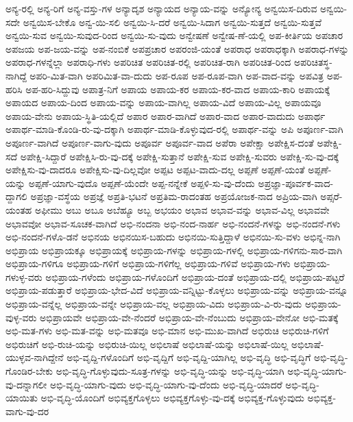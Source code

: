 {ಅನ್ಯ-ರಲ್ಲಿ
ಅನ್ಯ-ರಿಗೆ
ಅನ್ಯ-ವಸ್ತು-ಗಳ
ಅನ್ಯಾದೃಶ
ಅನ್ಯಾಯದ
ಅನ್ಯಾಯ-ವನ್ನು
ಅನ್ಯೋನ್ಯ
ಅನ್ವಯಿಸ-ದಿರುವ
ಅನ್ವಯಿ-ಸದೇ
ಅನ್ವಯಿಸ-ಬೇಕೊ
ಅನ್ವ-ಯಿ-ಸಲಿ
ಅನ್ವಯಿ-ಸಿ-ದರೆ
ಅನ್ವಯಿ-ಸಿದಾಗ
ಅನ್ವಯಿ-ಸುತ್ತದೆ
ಅನ್ವಯಿ-ಸುತ್ತವೆ
ಅನ್ವಯಿ-ಸುವ
ಅನ್ವಯಿ-ಸುವುದ-ರಿಂದ
ಅನ್ವಯಿ-ಸು-ವುದು
ಅನ್ವೇಷಣೆ
ಅನ್ವೇಷ-ಣೆ-ಯಲ್ಲಿ
ಅಪ-ಕೀರ್ತಿಯ
ಅಪಚಾರ
ಅಪಜಯ
ಅಪ-ಜಯ-ವನ್ನು
ಅಪ-ನಂಬಿಕೆ
ಅಪಪ್ರಚಾರ
ಅಪರಂಜಿ-ಯಂತೆ
ಅಪರಾಧ
ಅಪರಾಧಕ್ಕಾಗಿ
ಅಪರಾಧ-ಗಳನ್ನು
ಅಪರಾಧ-ಗಳನ್ನೆಲ್ಲಾ
ಅಪರಾಧಿ-ಗಳು
ಅಪರಿಚಿತ
ಅಪರಿಚಿತ-ರಲ್ಲಿ
ಅಪರಿಚಿತ-ರಾಗಿ
ಅಪರಿಚಿತ-ರಿಂದ
ಅಪರಿಚಿತಸ್ಥ-ನಾಗಿದ್ದೆ
ಅಪರಿ-ಮಿತ-ವಾಗಿ
ಅಪರಿಮಿತ-ವಾ-ದುದು
ಅಪ-ರೂಪ
ಅಪ-ರೂಪ-ವಾಗಿ
ಅಪ-ವಾದ-ವನ್ನು
ಅಪವಿತ್ರ
ಅಪ-ಹರಿಸಿ
ಅಪ-ಹರಿ-ಸಿದ್ದುವು
ಅಪಾತ್ರ-ನಿಗೆ
ಅಪಾಯ
ಅಪಾಯ-ಕರ
ಅಪಾಯ-ಕರ-ವಾದ
ಅಪಾಯ-ಕಾರಿ
ಅಪಾಯಕ್ಕೆ
ಅಪಾಯದ
ಅಪಾಯ-ದಿಂದ
ಅಪಾಯ-ವನ್ನು
ಅಪಾಯ-ವಾಗಿಲ್ಲ
ಅಪಾಯ-ವಿದೆ
ಅಪಾಯ-ವಿಲ್ಲ
ಅಪಾಯವೂ
ಅಪಾಯ-ವೇನು
ಅಪಾಯ-ಸ್ಥಿತಿ-ಯಲ್ಲಿದೆ
ಅಪಾರ
ಅಪಾರ-ವಾಗಿದೆ
ಅಪಾರ-ವಾದ
ಅಪಾರ-ವಾದುದು
ಅಪಾರ್ಥ
ಅಪಾರ್ಥ-ಮಾಡಿ-ಕೊಂಡಿ-ರು-ವು-ದಕ್ಕಾಗಿ
ಅಪಾರ್ಥ-ಮಾಡಿ-ಕೊಳ್ಳುವುದ-ರಲ್ಲಿ
ಅಪಾರ್ಥ-ವನ್ನು
ಅಪಿ
ಅಪೂರ್ಣ-ವಾಗಿ
ಅಪೂರ್ಣ-ವಾಗಿದೆ
ಅಪೂರ್ಣ-ವಾಗು-ವುದು
ಅಪೂರ್ವ
ಅಪೂರ್ವ-ವಾದ
ಅಪೆರಾ
ಅಪೇಕ್ಷಾ
ಅಪೇಕ್ಷಿಸ-ದಂತೆ
ಅಪೇಕ್ಷಿ-ಸದೆ
ಅಪೇಕ್ಷಿ-ಸಿದ್ದಾರೆ
ಅಪೇಕ್ಷಿಸಿ-ರು-ವು-ದಕ್ಕೆ
ಅಪೇಕ್ಷಿ-ಸುತ್ತಾನೆ
ಅಪೇಕ್ಷಿ-ಸುವ
ಅಪೇಕ್ಷಿ-ಸುವರು
ಅಪೇಕ್ಷಿ-ಸು-ವು-ದಕ್ಕೆ
ಅಪೇಕ್ಷಿಸು-ವು-ದಾದರೂ
ಅಪೇಕ್ಷಿಸು-ವು-ದಿಲ್ಲವೋ
ಅಪ್ಪಟ
ಅಪ್ಪಟ-ವಾದು-ದಲ್ಲ
ಅಪ್ಪಣೆ
ಅಪ್ಪಣೆ-ಯಂತೆ
ಅಪ್ಪಣೆ-ಯನ್ನು
ಅಪ್ಪಣೆ-ಯಾಗು-ವುದೊ
ಅಪ್ಪಣೆ-ಯೆಂದೇ
ಅಪ್ಪ-ನನ್ನೇಕೆ
ಅಪ್ಪಳಿ-ಸು-ವು-ದೆಂದು
ಅಪ್ರಜ್ಞಾ-ಪೂರ್ವಕ-ವಾದ-ದ್ದಾಗಲಿ
ಅಪ್ರಜ್ಞಾ-ವಸ್ಥೆಯ
ಅಪ್ರಜ್ಞೆ
ಅಪ್ರತಿ-ಭಟನೆ
ಅಪ್ರತಿಮ-ರಾದಂತಹ
ಅಪ್ರಯೋಜಕ-ನಾದ
ಅಪ್ರಿಯ-ವಾಗಿ
ಅಪ್ಸರೆ-ಯಂತಹ
ಅಫೀಮು
ಅಬು
ಅಬೂ
ಅಬೆಹ್ಯೂ
ಅಬ್ಬ
ಅಭಯಂ
ಅಭಾವ
ಅಭಾವ-ವನ್ನು
ಅಭಾವ-ವಿಲ್ಲ
ಅಭಾವವೇ
ಅಭಾವವೋ
ಅಭಾವ-ಸೂಚಕ-ವಾಗಿದೆ
ಅಭಿ-ನಂದನಾ
ಅಭಿ-ನಂದ-ನಾರ್ಹ
ಅಭಿ-ನಂದನೆ-ಗಳನ್ನು
ಅಭಿ-ನಂದನೆ-ಗಳು
ಅಭಿ-ನಂದನೆ-ಗಳೊ-ಡನೆ
ಅಭಿನಯ
ಅಭಿನಯಿಸ-ಬಹುದು
ಅಭಿನಯಿ-ಸುತ್ತಿದ್ದಾಳೆ
ಅಭಿನಯಿ-ಸು-ವಳು
ಅಭಿನ್ನ-ನಾಗಿ
ಅಭಿಪ್ರಾಯ
ಅಭಿಪ್ರಾಯಕ್ಕೂ
ಅಭಿಪ್ರಾಯಕ್ಕೆ
ಅಭಿಪ್ರಾಯ-ಗಳನ್ನು
ಅಭಿಪ್ರಾಯ-ಗಳಲ್ಲಿ
ಅಭಿಪ್ರಾಯ-ಗಳಿಗನು-ಸಾರ-ವಾಗಿ
ಅಭಿಪ್ರಾಯ-ಗಳಿಗೂ
ಅಭಿಪ್ರಾಯ-ಗಳಿಗೆ
ಅಭಿಪ್ರಾಯ-ಗಳಿಗೆಲ್ಲ
ಅಭಿಪ್ರಾಯ-ಗಳಿವೆ
ಅಭಿಪ್ರಾಯ-ಗಳು
ಅಭಿಪ್ರಾಯ-ಗಳುಳ್ಳ-ವರು
ಅಭಿಪ್ರಾಯ-ಗಳೆಂದು
ಅಭಿಪ್ರಾಯ-ಗಳೊಂದಿಗೆ
ಅಭಿಪ್ರಾಯ-ದಂತೆ
ಅಭಿಪ್ರಾಯ-ದಲ್ಲಿ
ಅಭಿಪ್ರಾಯ-ಪಟ್ಟರೆ
ಅಭಿಪ್ರಾಯ-ಪಡುತ್ತಾರೆ
ಅಭಿಪ್ರಾಯ-ಭೇದ-ವಿದೆ
ಅಭಿಪ್ರಾಯ-ವನ್ನಿಟ್ಟು-ಕೊಳ್ಳಲು
ಅಭಿಪ್ರಾಯ-ವನ್ನು
ಅಭಿಪ್ರಾಯ-ವನ್ನೂ
ಅಭಿಪ್ರಾಯ-ವನ್ನೆಲ್ಲ
ಅಭಿಪ್ರಾಯ-ವನ್ನೇ
ಅಭಿಪ್ರಾಯ-ವಲ್ಲ
ಅಭಿಪ್ರಾಯ-ವಿದು
ಅಭಿಪ್ರಾಯ-ವಿ-ರು-ವುದು
ಅಭಿಪ್ರಾಯ-ವುಳ್ಳ-ವರು
ಅಭಿಪ್ರಾಯವೇ
ಅಭಿಪ್ರಾಯ-ವೇ-ನೆಂದರೆ
ಅಭಿಪ್ರಾಯ-ವೇ-ನೆಂಬುದು
ಅಭಿಪ್ರಾಯ-ವೇನೋ
ಅಭಿ-ಮತಕ್ಕೆ
ಅಭಿ-ಮತ-ಗಳು
ಅಭಿ-ಮತ-ವನ್ನು
ಅಭಿ-ಮತವೂ
ಅಭಿ-ಮಾನ
ಅಭಿ-ಮುಖ-ವಾಗಿದೆ
ಅಭಿರುಚಿ
ಅಭಿರುಚಿ-ಗಳಿಗೆ
ಅಭಿರುಚಿಗೆ
ಅಭಿ-ರುಚಿ-ಯನ್ನು
ಅಭಿರುಚಿ-ಯಿಲ್ಲ
ಅಭಿಲಾಷೆ
ಅಭಿಲಾಷೆ-ಯನ್ನು
ಅಭಿಲಾಷೆ-ಯಿಲ್ಲ
ಅಭಿಲಾಷೆ-ಯುಳ್ಳವ-ನಾಗಿದ್ದೇನೆ
ಅಭಿ-ವೃದ್ದಿ-ಗಳೊಂದಿಗೆ
ಅಭಿ-ವೃದ್ದಿಗೆ
ಅಭಿ-ವೃದ್ದಿ-ಯಾಗಿಲ್ಲ
ಅಭಿ-ವೃದ್ಧಿ
ಅಭಿ-ವೃದ್ಧಿಗೆ
ಅಭಿ-ವೃದ್ಧಿ-ಗೊಂಡಿರ-ಬೇಕು
ಅಭಿ-ವೃದ್ಧಿ-ಗೊಳ್ಳುವುದು-ಸೂತ್ರ-ಗಳನ್ನು
ಅಭಿ-ವೃದ್ಧಿ-ಯನ್ನು
ಅಭಿ-ವೃದ್ಧಿ-ಯಾಗಿ
ಅಭಿ-ವೃದ್ಧಿ-ಯಾಗು-ವು-ದನ್ನಾಗಲೀ
ಅಭಿ-ವೃದ್ಧಿ-ಯಾಗು-ವುದು
ಅಭಿ-ವೃದ್ಧಿ-ಯಾಗು-ವು-ದೆಂದು
ಅಭಿ-ವೃದ್ಧಿ-ಯಾದರೆ
ಅಭಿ-ವೃದ್ಧಿ-ಯಾಯಿತು
ಅಭಿ-ವೃದ್ಧಿ-ಯೊಂದಿಗೆ
ಅಭಿವ್ಯಕ್ತಗೊಳ್ಳಲು
ಅಭಿವ್ಯಕ್ತಗೊಳ್ಳು-ವು-ದಕ್ಕೆ
ಅಭಿವ್ಯಕ್ತ-ಗೊಳ್ಳುವುದು
ಅಭಿವ್ಯಕ್ತ-ವಾಗು-ವು-ದರ
}
